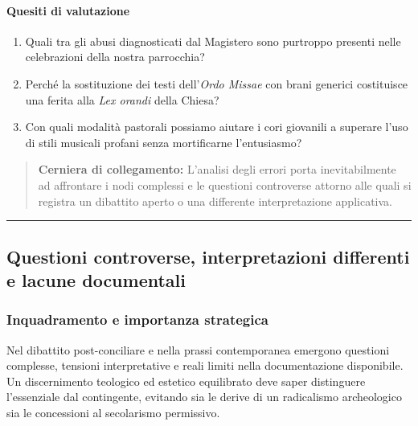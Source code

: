 \documentclass[12pt,a4paper]{article}
\begin{document}
	\paragraph{Quesiti di valutazione}\label{quesiti-di-valutazione}
	
	\begin{enumerate}[label=\arabic*.,leftmargin=*]
		\item Quali tra gli abusi diagnosticati dal Magistero sono purtroppo presenti nelle celebrazioni della nostra parrocchia?
		\item Perché la sostituzione dei testi dell'\emph{Ordo Missae} con brani generici costituisce una ferita alla \emph{Lex orandi} della Chiesa?
		\item Con quali modalità pastorali possiamo aiutare i cori giovanili a superare l'uso di stili musicali profani senza mortificarne l'entusiasmo?
	\end{enumerate}
	
	\begin{quote}
		\textbf{Cerniera di collegamento:} L'analisi degli errori porta inevitabilmente ad affrontare i nodi complessi e le questioni controverse attorno alle quali si registra un dibattito aperto o una differente interpretazione applicativa.
	\end{quote}
	
	\begin{center}\rule{0.5\linewidth}{0.5pt}\end{center}
	
	\subsection{Questioni controverse, interpretazioni differenti e lacune documentali}\label{questioni-controverse-interpretazioni-differenti-e-lacune-documentali}
	
	\subsubsection{Inquadramento e importanza strategica}\label{inquadramento-e-importanza-strategica-14}
	
	Nel dibattito post-conciliare e nella prassi contemporanea emergono questioni complesse, tensioni interpretative e reali limiti nella documentazione disponibile. Un discernimento teologico ed estetico equilibrato deve saper distinguere l'essenziale dal contingente, evitando sia le derive di un radicalismo archeologico sia le concessioni al secolarismo permissivo.
	
\end{document}
